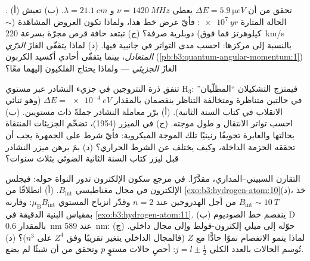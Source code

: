 \begin{exercise}[$\star\star$]\label{exo:b3:spin-two-level:8}
. (أ) تحقق من أن $\Delta E = \qty{5.9}{\micro eV}$
يعطي $\nu = \qty{1420}{MHz}$ و $\lambda = \qty{21.1}{cm}$. (ب)
تعيش الحالة المثارة $\qty{e7}{yr}$: فأيّ عرض خط هذا،
ولماذا تكون العروض المشاهَدة ($\sim$ كيلوهرتز فما فوق) دوبلرية صرفة؟ (ج)
تبتعد حافة قرص مجرّة بسرعة \qty{220}{km/s} بالنسبة إلى
مركزها: احسب مدى التواتر في جانبية  فيها. (د) لماذا
يتقفّى  الغازَ \emph{الذرّي المتعادل}، بينما يتقفّى أحادي
أكسيد الكربون (\cref{pb:b3:quantum-angular-momentum:1}) الغازَ
\emph{الجزيئي} --- ولماذا يحتاج الفلكيون إليهما معًا؟
\end{exercise}

\begin{exercise}[$\star\star$]\label{exo:b3:spin-two-level:9}
تنفق ذرة النتروجين في جزيء النشادر عبر مستوي H$_3$:
فيمتزج التشكيلان ``المظلّيان'' في حالتين متناظرة ومتخالفة
التناظر ينفصمان بالمقدار $\Delta E = \qty{e-4}{eV}$ (وهو ثنائي
الانقلاب في كتاب السنة الثانية). (أ) برّر معاملة
النشادر جملةً ذات مستويين. (ب) احسب تواتر الانتقال و
طول موجته. (ج) في الميزر (1954)، تضخّم الجزيئات المنتقاة بحالتها
والعابرة تجويفًا رنينيًا تلك الموجة الميكروية: فأيّ شرط على
الجمهرة يجب أن تحققه الحزمة الداخلة، وكيف يختلف عن
الشرط الحراري؟ (د) بمَ برهن ميزر النشادر قبل ليزر
كتاب السنة الثانية الضوئي بثلاث سنوات؟
\end{exercise}

\begin{exercise}[$\star\star\star$]\label{exo:b3:spin-two-level:10}
التقارن السبيني--المداري، مقدَّرًا. في مرجع سكون الإلكترون
تدور النواة حوله: فيجلس الإلكترون في مجال مغناطيسي $B_{\text
{int}}$. (أ) انطلاقًا من \cref{exo:b3:hydrogen-atom:10}(د)، خذ
$B_{\text{int}} \sim \qty{10}{T}$ من أجل الهدروجين عند $n = 2$ وقدّر
انزياح المستوي $\mu_{\text{B}}B_{\text{int}}$: وقارنه
بمقياس البنية الدقيقة في \cref{exo:b3:hydrogen-atom:11}. (ب) ينفصم
خط الصوديوم D بالمقدار \qty{0.6}{nm} عند \qty{589}{nm}: حوّله إلى ميلي إلكترون-فولط
وإلى مجال داخلي. (ج) لماذا ينمو الانفصام نموًا حادًّا
مع $Z$ (فالمجال الداخلي يتغير تقريبًا وفق $Z^4$ على $n^3$)؟
(د) تُوسم الحالات بالعدد الكلي $j = l \pm \tfrac12$: أحصِ
حالات مستوٍ $p$ وتحقق من أن شيئًا لم يضع.
\end{exercise}

